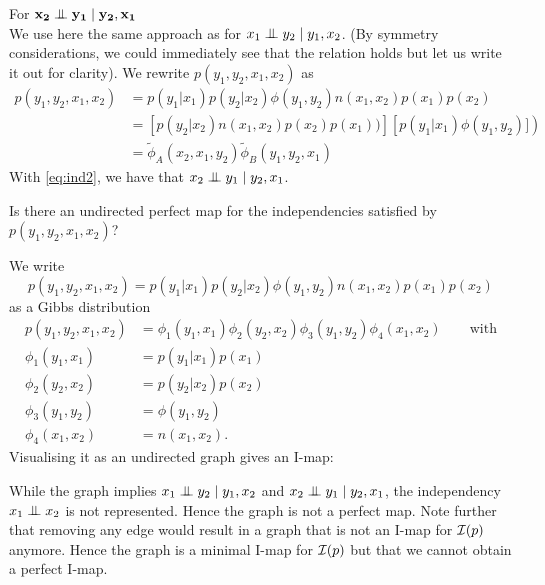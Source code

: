 \begin{exenumerate}
\begin{solution}
    \vspace{2ex}
    For $\mathbf{x_2 \mathrel{\perp\mspace{-10mu}\perp} y_1 \mid y_2, x_1}$\\ We use here the
    same approach as for $x_1 \mathrel{\perp\mspace{-10mu}\perp} y_2 \mid y_1, x_2$. (By
    symmetry considerations, we could immediately see that the
    relation holds but let us write it out for clarity).  We rewrite $p(y_1,y_2,x_1,x_2)$ as
    \begin{align}
      p(y_1,y_2,x_1,x_2) & =  p(y_1 | x_1) p(y_2 | x_2) \phi(y_1,y_2) n(x_1,x_2) p(x_1) p(x_2)\\
      & =  \left[  p(y_2 | x_2)  n(x_1,x_2) p(x_2)p(x_1) )\right]\left[ p(y_1 | x_1) \phi(y_1,y_2) ]\right)\\
      & = \tilde{\phi}_A(x_2,x_1,y_2) \tilde{\phi}_B(y_1,y_2,x_1)
    \end{align}
    With \eqref{eq:ind2}, we have that $x_2 \mathrel{\perp\mspace{-10mu}\perp} y_1 \mid y_2,x_1$. 

  \end{solution}


\item Is there an undirected perfect map for the independencies
  satisfied by $p(y_1,y_2,x_1,x_2)$?

  \begin{solution}
    We write 
    $$p(y_1,y_2,x_1,x_2) = p(y_1 | x_1) p(y_2 | x_2) \phi(y_1,y_2) n(x_1,x_2) p(x_1) p(x_2)$$
    as a Gibbs distribution
    \begin{align}
      p(y_1,y_2,x_1,x_2) & = \phi_1(y_1,x_1) \phi_2(y_2,x_2) \phi_3(y_1,y_2) \phi_4(x_1,x_2) \quad \quad \text{with} \\
      \phi_1(y_1,x_1) & =p(y_1 | x_1)p(x_1)   \\
      \phi_2(y_2,x_2)& =  p(y_2 | x_2)p(x_2)\\
      \phi_3(y_1,y_2)& =  \phi(y_1,y_2) \\
      \phi_4(x_1,x_2)& = n(x_1,x_2). 
    \end{align}
    Visualising it as an undirected graph gives an I-map:
     \begin{center}
     \end{center}
   While the graph implies $x_1 \mathrel{\perp\mspace{-10mu}\perp} y_2 \mid y_1, x_2$ and
   $x_2 \mathrel{\perp\mspace{-10mu}\perp} y_1 \mid y_2, x_1$, the independency $x_1
   \mathrel{\perp\mspace{-10mu}\perp} x_2$ is not represented. Hence the graph is not a
   perfect map. Note further that removing any edge would result in a
   graph that is not an I-map for $\mathcal{I}(p)$ anymore. Hence the graph
   is a minimal I-map for $\mathcal{I}(p)$ but that we cannot obtain a
   perfect I-map.


\end{solution}
\end{exenumerate}
